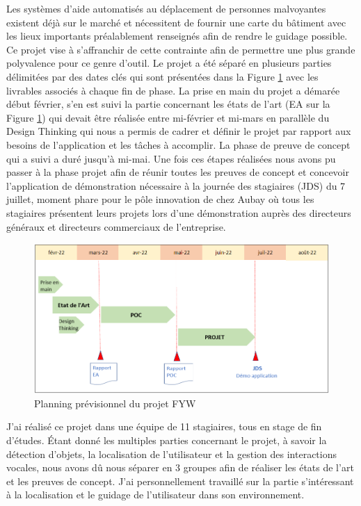 \documentclass[11pt]{article}
\begin{document}
  Les systèmes d'aide automatisés au déplacement de personnes malvoyantes existent déjà sur le marché et nécessitent de fournir une 
  carte du bâtiment avec les lieux importants préalablement renseignés afin de rendre le guidage possible. Ce projet vise à s'affranchir 
  de cette contrainte afin de permettre une plus grande polyvalence pour ce genre d'outil.
  Le projet a été séparé en plusieurs parties délimitées par des dates clés qui sont présentées dans la Figure \ref{fig:Planning} 
  avec les livrables associés à chaque fin de phase.
  La prise en main du projet a démarée début février, s'en est suivi la partie concernant les états de l'art (EA sur la Figure \ref{fig:Planning}) qui devait être 
  réalisée entre mi-février et mi-mars en parallèle du Design Thinking qui nous a permis de cadrer et définir le projet par rapport 
  aux besoins de l'application et les tâches à accomplir. La phase de preuve de concept qui a suivi a duré jusqu'à mi-mai. 
  Une fois ces étapes réalisées nous avons pu passer à la phase projet afin de réunir toutes les preuves de concept et concevoir l'application 
  de démonstration nécessaire à la journée des stagiaires (JDS) du 7 juillet, moment phare pour le pôle innovation de chez Aubay où tous 
  les stagiaires présentent leurs projets lors d'une démonstration auprès des directeurs généraux et directeurs commerciaux de l'entreprise.

  \begin{figure}[hbt]  
    \includegraphics[width=\textwidth]{Planning.png}    
    \caption{Planning prévisionnel du projet FYW}
    \label{fig:Planning}
  \end{figure}  
  
  J'ai réalisé ce projet dans une équipe de 11 stagiaires, tous en stage de fin d'études. Étant donné les multiples parties concernant le projet, à savoir la détection d'objets, la localisation de
  l'utilisateur et la gestion des interactions vocales, nous avons dû nous séparer en 3 groupes afin de réaliser les états de l'art
  et les preuves de concept. J'ai personnellement travaillé sur la partie s'intéressant à la localisation et le guidage de l'utilisateur
  dans son environnement. 
  \pagebreak
 
\end{document}

